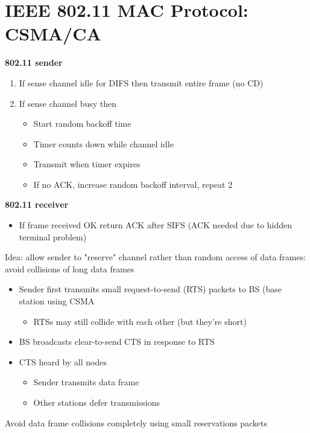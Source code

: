 \documentclass{article}[18pt]
\begin{document}
\section{IEEE 802.11 MAC Protocol: CSMA/CA}
\textbf{802.11 sender}
\begin{enumerate}
	\item If sense channel idle for DIFS then transmit entire frame (no CD)
	\item If sense channel busy then
	\begin{itemize}
		\item Start random backoff time
		\item Timer counts down while channel idle
		\item Transmit when timer expires
		\item If no ACK, increase random backoff interval, repeat 2
	\end{itemize}
\end{enumerate}
\textbf{802.11 receiver}
\begin{itemize}
	\item If frame received OK return ACK after SIFS (ACK needed due to hidden terminal problem)
\end{itemize}
Idea: allow sender to "reserve" channel rather than random access of data frames: avoid collisions of long data frames
\begin{itemize}
	\item Sender first transmits small request-to-send (RTS) packets to BS (base station using CSMA
	\begin{itemize}
		\item RTSs may still collide with each other (but they're short)
	\end{itemize}
	\item BS broadcasts clear-to-send CTS in response to RTS
	\item CTS heard by all nodes
	\begin{itemize}
		\item Sender transmits data frame
		\item Other stations defer transmissions
	\end{itemize}
\end{itemize}
\begin{important}[Collisions]
Avoid data frame collisions completely using small reservations packets
\end{important}
\end{document}
